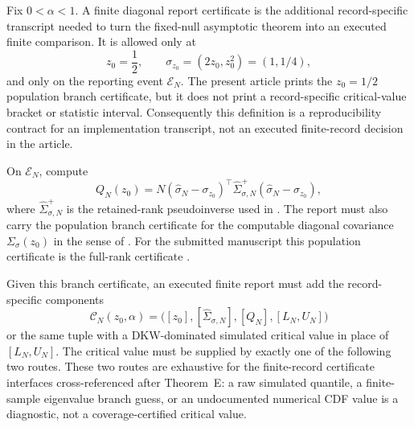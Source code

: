 \begin{definition}\label{def:finite-diagonal-report-main}
Fix \(0<\alpha<1\).  A finite diagonal report certificate is the additional
record-specific transcript needed to turn the fixed-null asymptotic theorem
into an executed finite comparison.  It is allowed only at
\[
z_0=\frac12,\qquad \sigma_{z_0}=(2z_0,z_0^2)=(1,1/4),
\]
and only on the reporting event \(\mathcal E_N\).  The present article prints
the \(z_0=1/2\) population branch certificate, but it does not print a
record-specific critical-value bracket or statistic interval.  Consequently
this definition is a reproducibility contract for an implementation transcript,
not an executed finite-record decision in the article.

On \(\mathcal E_N\), compute
\[
Q_N(z_0)=
N(\widehat\sigma_N-\sigma_{z_0})^\top
\widehat\Sigma_{\sigma,N}^{+}
(\widehat\sigma_N-\sigma_{z_0}),
\]
where \(\widehat\Sigma_{\sigma,N}^{+}\) is the retained-rank pseudoinverse
used in .  The report must
also carry the population branch certificate for the computable diagonal
covariance \(\Sigma_\sigma(z_0)\) in the sense of
.  For the submitted manuscript
this population certificate is the full-rank certificate
.

Given this branch certificate, an executed finite report must add the
record-specific components
\[
\mathcal C_N(z_0,\alpha)
=\bigl([z_0],[\widehat\Sigma_{\sigma,N}],[Q_N],[L_N,U_N]\bigr)
\]
or the same tuple with a DKW-dominated simulated critical value in place of
\([L_N,U_N]\).  The critical value must be supplied by exactly one of the
following two routes.  These two routes are exhaustive for the finite-record
certificate interfaces cross-referenced after Theorem~E: a raw simulated
quantile, a finite-sample eigenvalue branch guess, or an undocumented
numerical CDF value is a diagnostic, not a coverage-certified critical value.


\end{definition}
